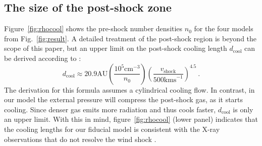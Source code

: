 \subsection{The size of the post-shock zone}
Figure~\ref{fig:rhocool} shows the pre-shock number densities $n_0$ for the four models from Fig.~\ref{fig:result}. A detailed treatment of the post-shock region is beyond the scope of this paper, but an upper limit on the post-shock cooling length $d_{\mathrm{cool}}$ can be derived according to \citet{2002ApJ...576L.149R}:
\begin{equation}
d_{\mathrm{cool}} \approx 20.9 \mathrm{ AU}
    \left(\frac{10^5\mathrm{ cm}^{-3}}{n_0}\right)
    \left(\frac{v_{\mathrm{shock}}}{500\mathrm{ km s}^{-1}}\right)^{4.5}\ .
\end{equation}
The derivation for this formula assumes a cylindrical cooling flow. In contrast, in our model the external pressure will compress the post-shock gas, as it starts cooling. Since denser gas emits more radiation and thus cools faster, $d_{\mathrm{cool}}$ is only an upper limit. With this in mind, figure~\ref{fig:rhocool} (lower panel) indicates that the cooling lengths for our fiducial model is consistent with the X-ray observations that do not resolve the wind shock \citep{2008A&A...488L..13S}.
